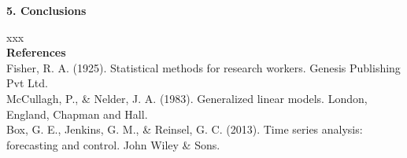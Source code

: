 \documentclass[11pt]{article}
\begin{document}
{\bf 5. Conclusions}


xxx\\

{\bf References}\\



Fisher, R. A. (1925). Statistical methods for research workers. Genesis Publishing Pvt Ltd.\\

McCullagh, P., \& Nelder, J. A. (1983). Generalized linear models. London, England, Chapman and Hall.\\

Box, G. E., Jenkins, G. M., \& Reinsel, G. C. (2013). Time series analysis: forecasting and control. John Wiley \& Sons.
\end{document}
